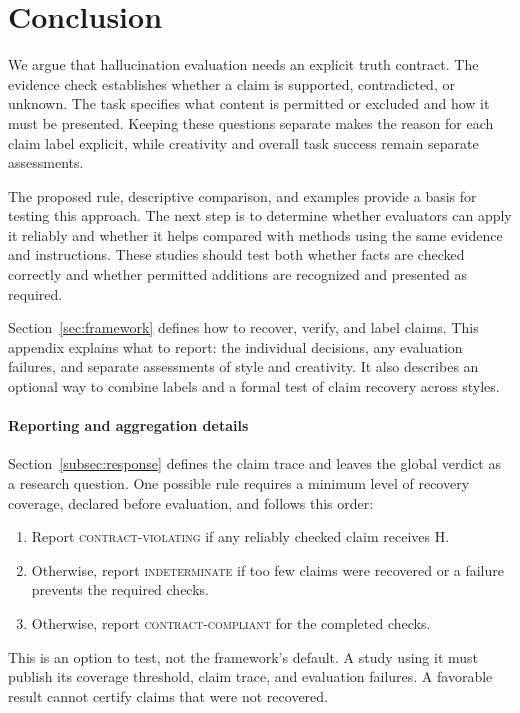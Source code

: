 \documentclass{clv2025}
\begin{document}
\section{Conclusion}\label{sec:conclusion}

We argue that hallucination evaluation needs an explicit truth contract.
The evidence check establishes whether a claim is supported, contradicted,
or unknown. The task specifies what content is permitted or excluded and how
it must be presented. Keeping these questions separate makes the reason for
each claim label explicit, while creativity and overall task success remain
separate assessments.

The proposed rule, descriptive comparison, and examples provide a
basis for testing this approach. The next step is to determine whether
evaluators can apply it reliably and whether it helps compared with methods
using the same evidence and instructions. These studies should test both
whether facts are checked correctly and whether permitted additions are
recognized and presented as required.
\clearpage

\appendix

%
\makeatletter\def\@currentlabel{A}\makeatother\label{app:diagnostics}

Section~\ref{sec:framework} defines how to recover, verify, and label claims.
This appendix explains what to report: the individual decisions, any
evaluation failures, and separate assessments of style and creativity.
It also describes an optional way to combine labels and a formal test of
claim recovery across styles.


\paragraph{Reporting and aggregation details}
Section~\ref{subsec:response} defines the claim trace and leaves the global
verdict as a research question. One possible rule requires a minimum level
of recovery coverage, declared before evaluation, and follows this order:
\begin{enumerate}
\item Report \textsc{contract-violating} if any reliably checked claim receives H.
\item Otherwise, report \textsc{indeterminate} if too few claims were recovered
or a failure prevents the required checks.
\item Otherwise, report \textsc{contract-compliant} for the completed checks.
\end{enumerate}
This is an option to test, not the framework's default. A study using it must
publish its coverage threshold, claim trace, and evaluation failures. A
favorable result cannot certify claims that were not recovered.
\end{document}
